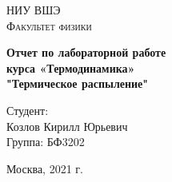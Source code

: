 \documentclass[14pt,a4paper, article,oneside]{ncc}
\begin{document}
\renewcommand{\chaptername}{Лабораторная работа}
\def\contentsname{Содержание}

\begin{titlepage}
\begin{center}
\textsc{НИУ ВШЭ\\[5mm]
Факультет физики}

\vfill
\textbf{Отчет по лабораторной работе \\[3mm]
курса «Термодинамика»\\[6mm]
"Термическое распыление"
\\[70mm]
}

\end{center}

\hfill
\begin{minipage}{.4\textwidth}
	 Студент:\\[2mm] 
Козлов Кирилл Юрьевич\\
Группа: БФ3202\\[5mm]



\end{minipage}
\vfill
\begin{center}
 Москва, 2021 г.
\end{center}
\end{titlepage}


\tableofcontents
\newpage


\end{document}
